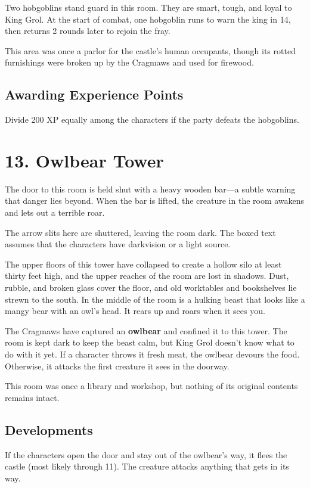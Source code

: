\documentclass[10pt,a4paper,twoside,bg=print,twocolumn,openany,nodeprecatedcode]{dndbook}
\begin{document}
Two hobgoblins stand guard in this room. They are smart, tough, and loyal to King Grol. At the start of combat, one hobgoblin runs to warn the king in 14, then returns 2 rounds later to rejoin the fray.

This area was once a parlor for the castle's human occupants, though its rotted furnishings were broken up by the Cragmaws and used for firewood.

\subsection{Awarding Experience Points}
Divide 200 XP equally among the characters if the party defeats the hobgoblins.

\section{13. Owlbear Tower}
The door to this room is held shut with a heavy wooden bar—a subtle warning that danger lies beyond. When the bar is lifted, the creature in the room awakens and lets out a terrible roar.

The arrow slits here are shuttered, leaving the room dark. The boxed text assumes that the characters have darkvision or a light source.

\begin{DndReadAloud}{}
The upper floors of this tower have collapsed to create a hollow silo at least thirty feet high, and the upper reaches of the room are lost in shadows. Dust, rubble, and broken glass cover the floor, and old worktables and bookshelves lie strewn to the south. In the middle of the room is a hulking beast that looks like a mangy bear with an owl's head. It rears up and roars when it sees you.

\end{DndReadAloud}

The Cragmaws have captured an \textbf{owlbear} and confined it to this tower. The room is kept dark to keep the beast calm, but King Grol doesn't know what to do with it yet. If a character throws it fresh meat, the owlbear devours the food. Otherwise, it attacks the first creature it sees in the doorway.

This room was once a library and workshop, but nothing of its original contents remains intact.

\subsection{Developments}
If the characters open the door and stay out of the owlbear's way, it flees the castle (most likely through 11). The creature attacks anything that gets in its way.
\end{document}
